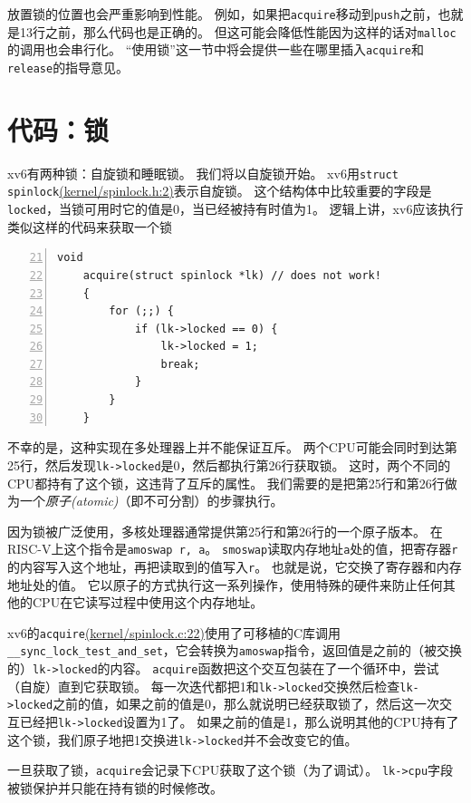 放置锁的位置也会严重影响到性能。
例如，如果把\texttt{acquire}移动到\texttt{push}之前，也就是13行之前，那么代码也是正确的。
但这可能会降低性能因为这样的话对\texttt{malloc}的调用也会串行化。
“使用锁”这一节中将会提供一些在哪里插入\texttt{acquire}和\texttt{release}的指导意见。

\section{代码：锁}
xv6有两种锁：自旋锁和睡眠锁。
我们将以自旋锁开始。
xv6用\texttt{struct spinlock}\href{https://github.com/mit-pdos/xv6-riscv/blob/risc/kernel/spinlock.h#L2}{(kernel/spinlock.h:2)}表示自旋锁。
这个结构体中比较重要的字段是\texttt{locked}，当锁可用时它的值是0，当已经被持有时值为1。
逻辑上讲，xv6应该执行类似这样的代码来获取一个锁
\begin{lstlisting}[numbers=left,firstnumber=21]
    void
    acquire(struct spinlock *lk) // does not work!
    {
        for (;;) {
            if (lk->locked == 0) {
                lk->locked = 1;
                break;
            }
        }
    }
\end{lstlisting}
不幸的是，这种实现在多处理器上并不能保证互斥。
两个CPU可能会同时到达第25行，然后发现\texttt{lk->locked}是0，然后都执行第26行获取锁。
这时，两个不同的CPU都持有了这个锁，这违背了互斥的属性。
我们需要的是把第25行和第26行做为一个\emph{原子(atomic)}（即不可分割）的步骤执行。

因为锁被广泛使用，多核处理器通常提供第25行和第26行的一个原子版本。
在RISC-V上这个指令是\texttt{amoswap r, a}。
\texttt{smoswap}读取内存地址\texttt{a}处的值，把寄存器\texttt{r}的内容写入这个地址，再把读取到的值写入\texttt{r}。
也就是说，它交换了寄存器和内存地址处的值。
它以原子的方式执行这一系列操作，使用特殊的硬件来防止任何其他的CPU在它读写过程中使用这个内存地址。

xv6的\texttt{acquire}\href{https://github.com/mit-pdos/xv6-riscv/blob/risc/kernel/spinlock.c#L22}{(kernel/spinlock.c:22)}使用了可移植的C库调用\texttt{\_\_sync\_lock\_test\_and\_set}，它会转换为\texttt{amoswap}指令，返回值是之前的（被交换的）\texttt{lk->locked}的内容。
\texttt{acquire}函数把这个交互包装在了一个循环中，尝试（自旋）直到它获取锁。
每一次迭代都把1和\texttt{lk->locked}交换然后检查\texttt{lk->locked}之前的值，如果之前的值是0，那么就说明已经获取锁了，然后这一次交互已经把\texttt{lk->locked}设置为1了。
如果之前的值是1，那么说明其他的CPU持有了这个锁，我们原子地把1交换进\texttt{lk->locked}并不会改变它的值。

一旦获取了锁，\texttt{acquire}会记录下CPU获取了这个锁（为了调试）。
\texttt{lk->cpu}字段被锁保护并只能在持有锁的时候修改。

